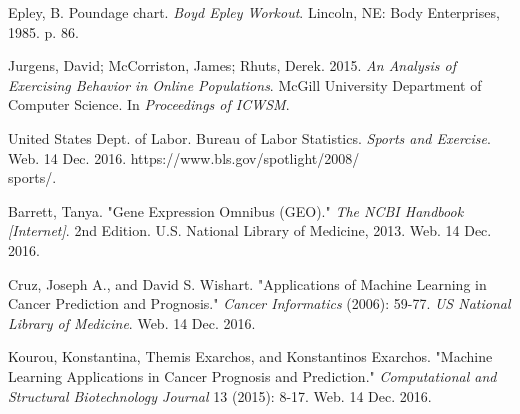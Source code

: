 \documentclass[12pt]{scrartcl}
\begin{document}
    \begin{thebibliography}{9}
Epley, B. Poundage chart. \textit{Boyd Epley Workout}. Lincoln, NE: Body Enterprises, 1985. p. 86.

Jurgens, David; McCorriston, James; Rhuts, Derek. 2015. \textit{An Analysis of Exercising Behavior in Online Populations}. McGill University Department of Computer Science. In \textit{Proceedings of ICWSM}.
 
United States Dept. of Labor. Bureau of Labor Statistics. \textit{Sports and Exercise}. Web. 14 Dec. 2016. https://www.bls.gov/spotlight/2008/\\sports/.

Barrett, Tanya. "Gene Expression Omnibus (GEO)." \textit{The NCBI Handbook [Internet]}. 2nd Edition. U.S. National Library of Medicine, 2013. Web. 14 Dec. 2016.

Cruz, Joseph A., and David S. Wishart. "Applications of Machine Learning in Cancer Prediction and Prognosis." \textit{Cancer Informatics} (2006): 59-77. \textit{US National Library of Medicine}. Web. 14 Dec. 2016.

Kourou, Konstantina, Themis Exarchos, and Konstantinos Exarchos. "Machine Learning Applications in Cancer Prognosis and Prediction." \textit{Computational and Structural Biotechnology Journal} 13 (2015): 8-17. Web. 14 Dec. 2016.

\end{thebibliography}
    
\end{document}

